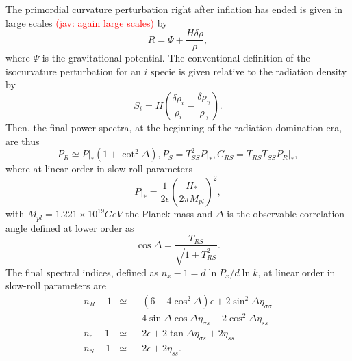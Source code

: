 \documentclass[amssymb,twocolumn,prd,nofootinbib,showpacs]{revtex4-1}
\newcommand{\jav}[1]{\textcolor{red}{(jav: #1)}}
\begin{document}
The primordial curvature perturbation right after inflation has ended is given in large scales \jav{again large scales} by
\begin{equation}
R=\Psi+\frac{H\delta\rho}{\rho},
\end{equation}
where $\Psi$ is the gravitational potential. The conventional definition of the isocurvature perturbation for an $i$ specie is given relative to the radiation density by
\begin{equation}
S_i=H\left(\frac{\delta\rho_{i}}{\rho_{i}}-\frac{\delta\rho_\gamma}{\rho_\gamma}\right).
\end{equation}
Then, the final power spectra, at the beginning of the radiation-domination era, are thus
\begin{subequations}\label{spectrums}
\begin{equation}\label{PRf}
P_R\simeq P|_*(1+\cot^2\Delta),
\end{equation}
\begin{equation}\label{isosecond}
P_S=T^2_{SS}P|_*,
\end{equation}
\begin{equation}
C_{RS}=T_{RS}T_{SS}P_R|_*,
\end{equation}
\end{subequations}
where at linear order in slow-roll parameters
\begin{equation}
P|_*=\frac{1}{2\epsilon}\left(\frac{H_*}{2\pi M_{pl}}\right)^2,
\end{equation}
with $M_{pl}=1.221\times 10^{19}GeV$ the Planck mass and $\Delta$ is the observable correlation angle defined at lower order as
\begin{equation}
\cos\Delta =\frac{T_{RS}}{\sqrt{1+T_{RS}^2}}.
\end{equation}
The final spectral indices, defined as $n_x-1=d\ln P_x/d\ln k$, at linear order in slow-roll parameters are
\begin{subequations}\label{tilts}
\begin{eqnarray}
n_R-1&\simeq & -(6-4\cos^2\Delta)\epsilon+2\sin^2\Delta\eta_{\sigma\sigma}\nonumber \\ &&+4\sin\Delta\cos\Delta\eta_{\sigma s}+2\cos^2\Delta\eta_{ss}\\
n_c-1&\simeq &-2\epsilon+2\tan\Delta\eta_{\sigma s}+2\eta_{ss}\\
n_S-1&\simeq & -2\epsilon+2\eta_{ss}.
\end{eqnarray}
\end{subequations}
\end{document}
